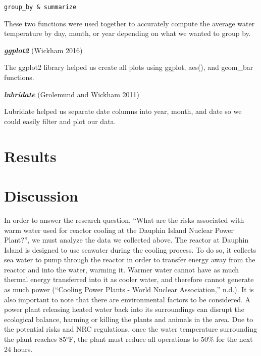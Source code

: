 \documentclass[
  letterpaper,
  DIV=11,
  numbers=noendperiod]{scrreprt}
\begin{document}
\texttt{group\_by\ \&\ summarize}

These two functions were used together to accurately compute the average
water temperature by day, month, or year depending on what we wanted to
group by.

\textbf{\emph{ggplot2}} (Wickham 2016)

The ggplot2 library helped us create all plots using ggplot, aes(), and
geom\_bar functions.

\textbf{\emph{lubridate}} (Grolemund and Wickham 2011)

Lubridate helped us separate date columns into year, month, and date so
we could easily filter and plot our data.


\chapter{Results}\label{results-1}


\chapter{Discussion}\label{discussion-1}

In order to answer the research question, ``What are the risks
associated with warm water used for reactor cooling at the Dauphin
Island Nuclear Power Plant?'', we must analyze the data we collected
above. The reactor at Dauphin Island is designed to use seawater during
the cooling process. To do so, it collects sea water to pump through the
reactor in order to transfer energy away from the reactor and into the
water, warming it. Warmer water cannot have as much thermal energy
transferred into it as cooler water, and therefore cannot generate as
much power ({``Cooling Power Plants - World Nuclear Association,''}
n.d.). It is also important to note that there are environmental factors
to be considered. A power plant releasing heated water back into its
surroundings can disrupt the ecological balance, harming or killing the
plants and animals in the area. Due to the potential risks and NRC
regulations, once the water temperature surrounding the plant reaches
85°F, the plant must reduce all operations to 50\% for the next 24
hours.
\end{document}
